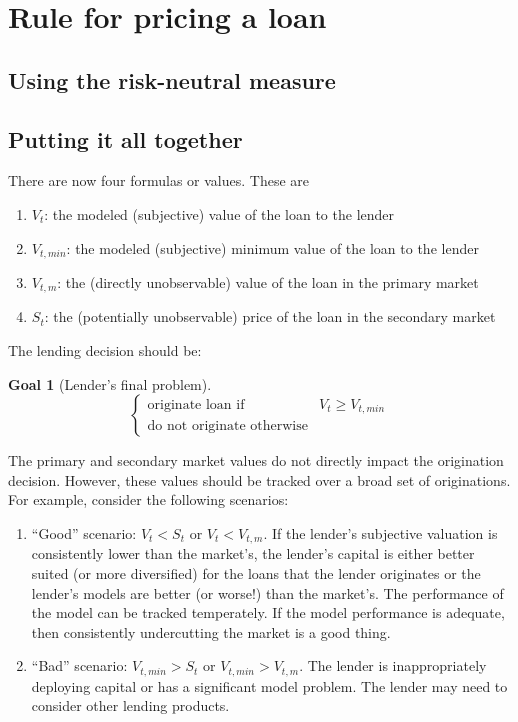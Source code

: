 \documentclass{article}
\theoremstyle{definition}
\newtheorem{goal}{Goal}
\begin{document}
\section{Rule for pricing a loan}

\subsection{Using the risk-neutral measure}





\subsection{Putting it all together}


There are now four formulas or values.  These are

\begin{enumerate}
	\item \(V_t\): the modeled (subjective) value of the loan to the lender
	\item \(V_{t, min}\): the modeled (subjective) minimum value of the loan to the lender
	\item \(V_{t, m}\): the (directly unobservable) value of the loan in the primary market
	\item \(S_t\): the (potentially unobservable) price of the loan in the secondary market
	
\end{enumerate}

The lending decision should be:


\begin{goal}[Lender's final problem] \label{lender3}
	\[
	\left\{
	\begin{array}{ll}
	\text{originate loan if} & V_t \geq V_{t, min}\\
	\text{do not originate otherwise} 
	\end{array} \right.
	\]
	
\end{goal}

The primary and secondary market values do not directly impact the origination decision.  However, these values should be tracked over a broad set of originations.  For example, consider the following scenarios:

\begin{enumerate}
	\item ``Good'' scenario:  \(V_t<S_t\) or \(V_t<V_{t, m}\).  If the lender's subjective valuation is consistently lower than the market's, the lender's capital is either better suited (or more diversified) for the loans that the lender originates or the lender's models are better (or worse!) than the market's.  The performance of the model can be tracked temperately.  If the model performance is adequate, then consistently undercutting the  market is a good thing.  
	\item ``Bad'' scenario: \(V_{t, min}>S_t\) or \(V_{t, min}>V_{t, m}\).  The lender is inappropriately deploying capital or has a significant model problem.  The lender may need to consider other lending products.  
\end{enumerate}
\end{document}
